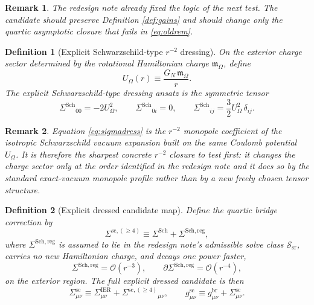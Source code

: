 \documentclass[11pt]{article}
\newcommand{\ReBridge}{g^{\mathrm{br}}}
\newcommand{\OpMetricSC}{g^{\mathrm{sc}}}
\newcommand{\SigmaIER}{\Sigma^{\mathrm{IER}}}
\newcommand{\SigmaSC}{\Sigma^{\mathrm{sc}}}
\newcommand{\SigmaSRFourSC}{\Sigma^{\mathrm{sc},(\ge 4)}}
\newcommand{\SigmaDressSch}{\Sigma^{\mathrm{Sch}}}
\newcommand{\SigmaRegSch}{\Sigma^{\mathrm{Sch,reg}}}
\newcommand{\HamChargeOmega}{\mathfrak m_{\Omega}}
\newcommand{\SolveClass}{\mathscr S_{\mathrm{sr}}}
\newtheorem{definition}{Definition}
\newtheorem{remark}{Remark}
\begin{document}
\begin{remark}
The redesign note already fixed the logic of the next test. The candidate should preserve Definition \ref{def:gains} and should change only the quartic asymptotic closure that fails in \eqref{eq:oldrem}.
\end{remark}

\begin{definition}[Explicit Schwarzschild-type \(r^{-2}\) dressing]
\label{def:dress}
On the exterior charge sector determined by the rotational Hamiltonian charge \(\HamChargeOmega\), define
\begin{equation}
U_\Omega(r)
\equiv
\frac{G_N\,\HamChargeOmega}{r}.
\label{eq:Uomega}
\end{equation}
The \emph{explicit Schwarzschild-type dressing ansatz} is the symmetric tensor
\begin{equation}
\SigmaDressSch{}_{00}=-2U_\Omega^2,
\qquad
\SigmaDressSch{}_{0i}=0,
\qquad
\SigmaDressSch{}_{ij}=\frac32 U_\Omega^2\,\delta_{ij}.
\label{eq:sigmadress}
\end{equation}
\end{definition}

\begin{remark}
Equation \eqref{eq:sigmadress} is the \(r^{-2}\) monopole coefficient of the isotropic Schwarzschild vacuum expansion built on the same Coulomb potential \(U_\Omega\). It is therefore the sharpest concrete \(r^{-2}\) closure to test first: it changes the charge sector only at the order identified in the redesign note and it does so by the standard exact-vacuum monopole profile rather than by a new freely chosen tensor structure.
\end{remark}

\begin{definition}[Explicit dressed candidate map]
\label{def:candidate}
Define the quartic bridge correction by
\begin{equation}
\SigmaSRFourSC
\equiv
\SigmaDressSch+\SigmaRegSch,
\label{eq:split}
\end{equation}
where \(\SigmaRegSch\) is assumed to lie in the redesign note's admissible solve class \(\SolveClass\), carries no new Hamiltonian charge, and decays one power faster,
\begin{equation}
\SigmaRegSch=\mathcal O(r^{-3}),
\qquad
\partial\SigmaRegSch=\mathcal O(r^{-4}),
\label{eq:reg}
\end{equation}
on the exterior region. The full explicit dressed candidate is then
\begin{equation}
\SigmaSC_{\mu\nu}
\equiv
\SigmaIER_{\mu\nu}
+\SigmaSRFourSC{}_{\mu\nu},
\qquad
\OpMetricSC_{\mu\nu}
\equiv
\ReBridge_{\mu\nu}
+\SigmaSC_{\mu\nu}.
\label{eq:gsc}
\end{equation}
\end{definition}
\end{document}

